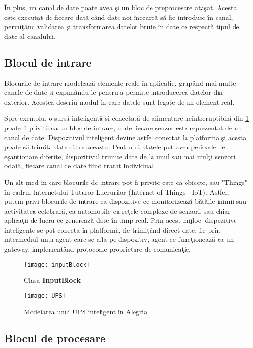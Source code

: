 În plus, un canal de date poate avea şi un bloc de preprocesare ataşat. Acesta este executat de fiecare dată când date noi încearcă să fie introduse în canal, permiţând validarea şi transformarea datelor brute în date ce respectă tipul de date al canalului.  
\subsection{Blocul de intrare}
Blocurile de intrare modelează elemente reale în aplicaţie, grupând mai multe canale de date şi expunându-le pentru a permite introducerea datelor din exterior. Acestea descriu modul în care datele sunt legate de un element real. 

Spre exemplu, o sursă inteligentă si conectată de alimentare neîntreruptibilă din \cref{fig:ups} poate fi privită ca un bloc de intrare, unde fiecare senzor este reprezentat de un canal de date. Dispozitivul inteligent devine astfel conectat la platforma şi acesta poate să trimită date către aceasta. Pentru că datele pot avea perioade de eşantionare diferite, dispozitivul trimite date de la unul sau mai mulţi senzori odată, fiecare canal de date fiind tratat individual.

Un alt mod în care blocurile de intrare pot fi privite este ca obiecte, sau "Things" în cadrul Internetului Tuturor Lucrurilor (Internet of Things - IoT). Astfel, putem privi blocurile de intrare ca dispozitive ce monitorizează bătăile inimii sau activitatea celebrară, ca automobile cu reţele complexe de senzori, sau chiar aplicaţii de lucru ce generează date în timp real. Prin acest mijloc, dispozitive inteligente se pot conecta în platformă, fie trimiţând direct date, fie prin intermediul unui agent care se află pe dispozitiv, agent ce funcţionează ca un gateway, implementând protocoale proprietare de comunicaţie.

\begin{figure}[H]
	\centering
	\texttt{[image: inputBlock]}
	\caption{Clasa \textbf{InputBlock}}
\end{figure}
\begin{figure}[H]
	\centering
	\texttt{[image: UPS]}
	\caption{Modelarea unui UPS inteligent în Alegria}
	\label{fig:ups}
\end{figure}

\subsection{Blocul de procesare}


